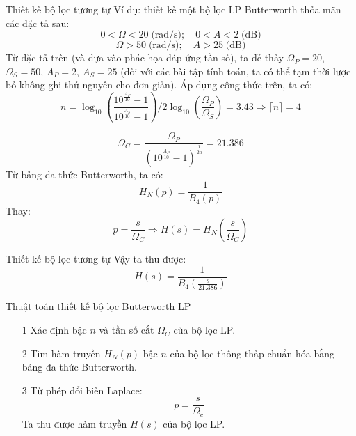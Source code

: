 \documentclass[8pt]{beamer}
\begin{document}
\begin{frame}{Thiết kế bộ lọc tương tự}
	Ví dụ: thiết kế một bộ lọc LP Butterworth thỏa mãn các đặc tả sau: $$0<\Omega<20\;\text{(rad/s)};\quad 0<A<2\;\text{(dB)}$$
$$\Omega>50\;\text{(rad/s)};\quad A>25\;\text{(dB)}$$
Từ đặc tả trên (và dựa vào phác họa đáp ứng tần số), ta dễ thấy $\Omega_{P}=20$, $\Omega_{S}=50$, $A_{P}=2$, $A_{S}=25$ (đối với các bài tập tính toán, ta có thể tạm thời lược bỏ không ghi thứ nguyên cho đơn giản).
Áp dụng công thức trên, ta có:
$$n=\log_{10}\left(\frac{10^{\frac{A_{P}}{10}}-1}{10^{\frac{A_{S}}{10}}-1}\right)\bigg/2\log_{10}\left(\frac{\Omega_{P}}{\Omega_{S}}\right)=3.43\Rightarrow \lceil n \rceil =4$$

$$\Omega_{C}=\frac{\Omega_{P}}{\left(10^{\frac{A_{P}}{10}}-1\right)^{\frac{1}{2n}}}=21.386$$
Từ bảng đa thức Butterworth, ta có: $$H_{N}(p)=\frac{1}{B_{4}(p)}$$
Thay: $$p=\frac{s}{\Omega_{C}}\Rightarrow H(s)=H_{N}\left(\frac{s}{\Omega_{C}}\right)$$
\end{frame}
\begin{frame}{Thiết kế bộ lọc tương tự}
	Vậy ta thu được: $$H(s)=\frac{1}{B_{4}\left(\frac{s}{21.386}\right)}$$
	\begin{block}{Thuật toán thiết kế bộ lọc Butterworth LP}
	\begin{enumerate}
		\item[1] Xác định bậc $n$ và tần số cắt $\Omega_{C}$ của bộ lọc LP.
		\item[2] Tìm hàm truyền $H_{N}(p)$ bậc $n$ của bộ lọc thông thấp chuẩn hóa bằng bảng đa thức Butterworth.
		\item[3] Từ phép đổi biến Laplace: $$p=\frac{s}{\Omega_{c}}$$ Ta thu được hàm truyền $H(s)$ của bộ lọc LP.
	\end{enumerate}
\end{block}
\end{frame}
\end{document}
